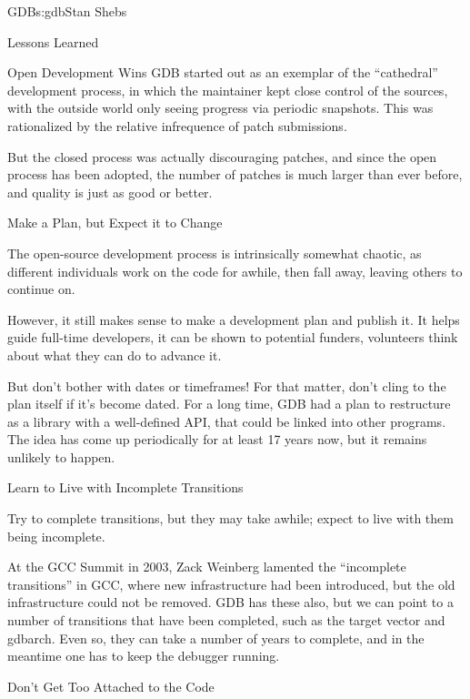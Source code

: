 \begin{aosachapter}{GDB}{s:gdb}{Stan Shebs}
\begin{aosasect1}{Lessons Learned}
\begin{aosasect2}{Open Development Wins}
GDB started out as an exemplar of the ``cathedral'' development
process, in which the maintainer kept close control of the sources,
with the outside world only seeing progress via periodic snapshots.
This was rationalized by the relative infrequence of patch submissions.

But the closed process was actually discouraging patches, and since
the open process has been adopted, the number of patches is much
larger than ever before, and quality is just as good or better.

\end{aosasect2}

\begin{aosasect2}{Make a Plan, but Expect it to Change}

The open-source development process is intrinsically somewhat chaotic,
as different individuals work on the code for awhile, then fall away,
leaving others to continue on.

However, it still makes sense to make a development plan and publish it.
It helps guide full-time developers, it can be shown to potential funders,
volunteers think about what they can do to advance it.

But don't bother with dates or timeframes!  For that matter, don't
cling to the plan itself if it's become dated.  For a long time, GDB
had a plan to restructure as a library  with a
well-defined API, that could be linked into other programs.  The idea
has come up periodically for at least 17 years now, but it remains
unlikely to happen.

\end{aosasect2}

\begin{aosasect2}{Learn to Live with Incomplete Transitions}

Try to complete transitions, but they may take awhile; expect to live
with them being incomplete.

At the GCC Summit in 2003, Zack Weinberg lamented the ``incomplete
transitions'' in GCC, where new infrastructure had been introduced,
but the old infrastructure could not be removed.  GDB has these also,
but we can point to a number of transitions that have been completed,
such as the target vector and gdbarch.  Even so, they can take a
number of years to complete, and in the meantime one has to keep the
debugger running.

\end{aosasect2}

\begin{aosasect2}{Don't Get Too Attached to the Code}


\end{aosasect2}
\end{aosasect1}
\end{aosachapter}
